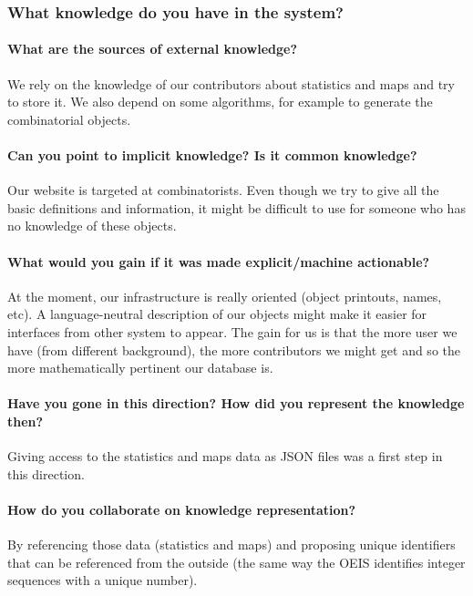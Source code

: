 \subsubsection{What knowledge do you have in the system?}
\paragraph{ What are the sources of external knowledge?}

We rely on the knowledge of our contributors about statistics and maps and try to store it. We also depend on some \SageMath algorithms, for example to generate the combinatorial
objects.

 \paragraph{Can you point to implicit knowledge? Is it common knowledge?}

Our website is targeted at combinatorists. Even though we try to give all the basic definitions and information, it might be difficult to use for someone who has no
knowledge of these objects.

 \paragraph{What would you gain if it was made explicit/machine actionable?}

At the moment, our infrastructure is really \SageMath oriented (object printouts, names, etc). A language-neutral description of our objects might make it easier for interfaces
from other system to appear. The gain for us is that the more user we have (from different background), the more contributors we might get and so the more mathematically
pertinent our database is.

 \paragraph{Have you gone in this direction? How did you represent the knowledge then?}

Giving access to the statistics and maps data as JSON files was a first step in this direction.

 \paragraph{How do you collaborate on knowledge representation?}

By referencing those data (statistics and maps) and proposing unique identifiers that can be referenced from the outside (the same way the OEIS identifies integer sequences with a unique number).

